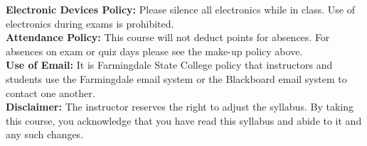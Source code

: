 \documentclass[11pt]{article}
\begin{document}
{\bf Electronic Devices Policy: }Please silence all electronics while in class. Use of electronics during exams is prohibited.\\

{\bf Attendance Policy: }This course will not deduct points for absences. For absences on exam or quiz days please see the make-up policy above. \\

{\bf Use of Email: }It is Farmingdale State College policy that instructors and students use the Farmingdale email system or the Blackboard email system to contact one another. \\

{\bf Disclaimer:} The instructor reserves the right to adjust the syllabus. By taking this course, you acknowledge that you have read this syllabus and abide
to it and any such changes.
% 
\end{document}
